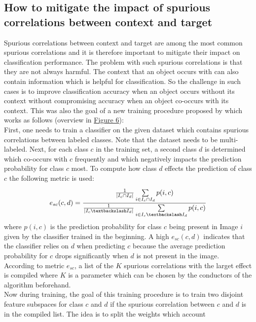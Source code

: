 \documentclass{article}
\begin{document}
\subsection{How to mitigate the impact of spurious correlations between context and target}
\label{sec:contextSuppr}
Spurious correlations between context and target are among the most common spurious correlations and it is
therefore important to mitigate their impact on classification performance. The problem with such spurious correlations
is that they are not always harmful. The context that an object occurs with can also contain information which is helpful
for classification. So the challenge in such cases is to improve classification accuracy when an object occurs without
its context without compromising accuracy when an object co-occurs with its context. This was also the goal of a
new training procedure proposed by \cite{Singh_2020_CVPR} which works as follows
(overview in \hyperref[fig:contextSupprImg]{Figure 6}): \\
First, one needs to train a classifier on the given dataset which contains spurious correlations between labeled classes.
Note that the dataset needs to be multi-labeled. Next, for each class $c$ in the training set, a second class $d$ is
determined which co-occurs with $c$ frequently and which negatively impacts the prediction probability for class $c$ most.
To compute how class $d$ effects the prediction of class $c$ the following metric is used:  
\begin{align*}
    e_{sc}(c,d) = \frac{\frac{1}{|I_c \cap I_d|} \sum\limits_{i \in I_c \cap I_d}^{} p(i,c)}
    {\frac{1}{|I_c \textbackslash I_d|} \sum\limits_{i \in I_c \textbackslash I_d} p(i,c)}
\end{align*}
where $p(i,c)$ is the prediction probability for class $c$ being present in Image $i$ given by the classifier
trained in the beginning. A high $e_{sc}(c,d)$ indicates that the classifier relies on $d$ when predicting $c$
because the average prediction probability for $c$ drops significantly when $d$ is not present in the image. \\
According to metric $e_{sc}$, a list of the $K$ spurious correlations with the larget effect is compiled where $K$
is a parameter which can be chosen by the conductors of the algorithm beforehand. \\
Now during training, the goal of this training procedure is to train two disjoint feature subspaces for class $c$ and $d$
if the spurious correlation between $c$ and $d$ is in the compiled list. The idea is to split the weights which account
\end{document}
